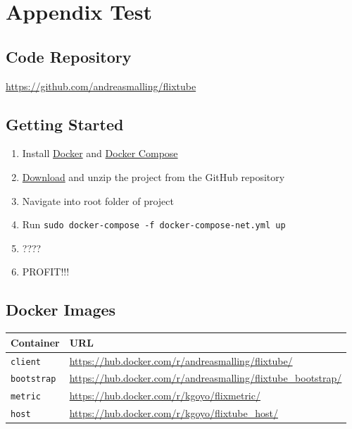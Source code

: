 \chapter{Appendix Test}
\section{Code Repository}
\label{app:code}

\url{https://github.com/andreasmalling/flixtube}

\section{Getting Started}
\begin{enumerate}
    \item Install \href{https://docs.docker.com/install/}{Docker} and \href{https://docs.docker.com/compose/install/}{Docker Compose}
    \item \href{https://github.com/andreasmalling/flixtube/archive/master.zip}{Download} and unzip the project from the GitHub repository
    \item Navigate into root folder of project
    \item Run \lstinline[columns=fixed]{sudo docker-compose -f docker-compose-net.yml up}
    \item ????
    \item PROFIT!!!
\end{enumerate}

\section{Docker Images}
\begin{table}[ht]
\centering
{}
\begin{tabular}{ll}
\toprule Container & URL \\\midrule
\texttt{client}     & \url{https://hub.docker.com/r/andreasmalling/flixtube/} \\
\texttt{bootstrap}  & \url{https://hub.docker.com/r/andreasmalling/flixtube_bootstrap/}    \\
\texttt{metric}     & \url{https://hub.docker.com/r/kgoyo/flixmetric/}   \\
\texttt{host}       & \url{https://hub.docker.com/r/kgoyo/flixtube_host/} \\\bottomrule
\end{tabular}

\end{table}

